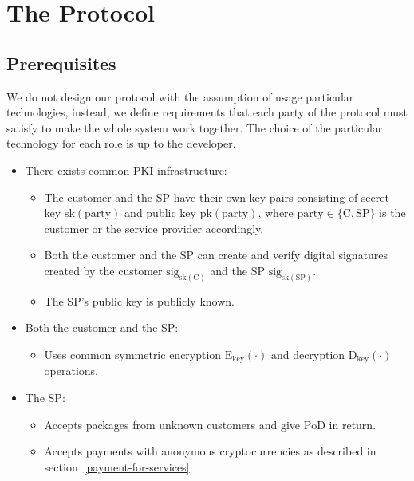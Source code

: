 \documentclass{ieeeaccess}
\begin{document}
\section{The Protocol}\label{sec:protocol}

\subsection{Prerequisites}
We do not design our protocol with the assumption of usage particular technologies, instead, we define requirements that each party of the protocol must satisfy to make the whole system work together. The choice of the particular technology for each role is up to the developer.

\begin{itemize}
\item There exists common PKI infrastructure:
    \begin{itemize}
        \item The customer and the SP have their own key pairs consisting of secret key $\mathrm{sk}(\mathrm{party})$ and public key $\mathrm{pk}(\mathrm{party})$, where $\mathrm{party} \in \{\mathrm{C}, \mathrm{SP}\}$ is the customer or the service provider accordingly.
        \item Both the customer and the SP can create and verify digital signatures created by the customer $\mathrm{sig}_{\mathrm{sk}(\mathrm{C})}$ and the SP $\mathrm{sig}_{\mathrm{sk}(\mathrm{SP})}$.
        \item The SP's public key is publicly known.
    \end{itemize}
    
\item Both the customer and the SP:
    \begin{itemize}
        \item Uses common symmetric encryption $\mathrm{E}_\mathrm{key}(\cdot)$ and decryption $\mathrm{D}_\mathrm{key}(\cdot)$ operations.
    \end{itemize}

\item The SP:
    \begin{itemize}
        \item Accepts packages from unknown customers and give $\mathrm{PoD}$ in return.
        \item Accepts payments with anonymous cryptocurrencies as described in section~\ref{payment-for-services}.
    \end{itemize}
    

\end{itemize}
\end{document}
